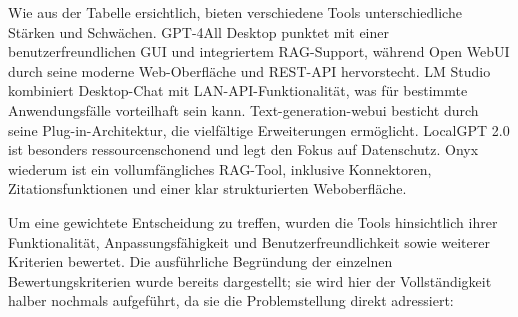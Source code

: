 Wie aus der Tabelle ersichtlich, bieten verschiedene Tools unterschiedliche Stärken und Schwächen.
GPT-4All Desktop punktet mit einer benutzerfreundlichen GUI und integriertem RAG-Support, während Open WebUI durch seine moderne Web-Oberfläche und REST-API hervorstecht.
LM Studio kombiniert Desktop-Chat mit LAN-API-Funktionalität, was für bestimmte Anwendungsfälle vorteilhaft sein kann.
Text-generation-webui besticht durch seine Plug-in-Architektur, die vielfältige Erweiterungen ermöglicht.
LocalGPT 2.0 ist besonders ressourcenschonend und legt den Fokus auf Datenschutz.
Onyx wiederum ist ein vollumfängliches RAG-Tool, inklusive Konnektoren, Zitationsfunktionen und einer klar strukturierten Weboberfläche.

Um eine gewichtete Entscheidung zu treffen, wurden die Tools hinsichtlich ihrer Funktionalität, Anpassungsfähigkeit und Benutzerfreundlichkeit sowie weiterer Kriterien bewertet.
Die ausführliche Begründung der einzelnen Bewertungskriterien wurde bereits dargestellt; sie wird hier der Vollständigkeit halber nochmals aufgeführt, da sie die Problemstellung direkt adressiert:

